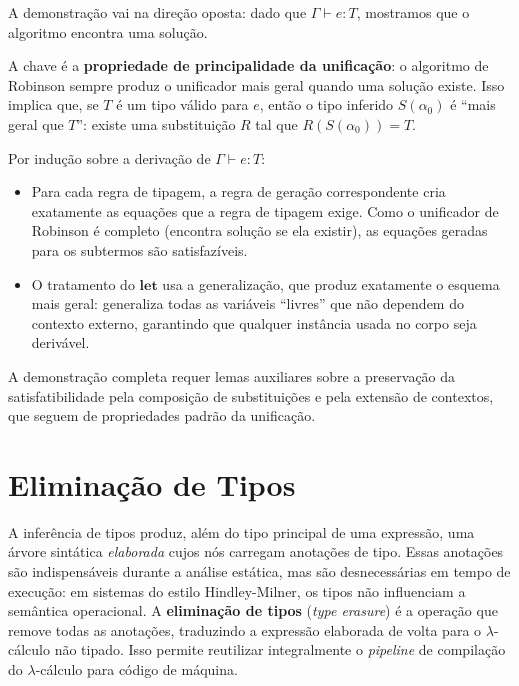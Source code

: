   A demonstração vai na direção oposta: dado que \(\Gamma \vdash e :
  T\), mostramos que o algoritmo encontra uma solução.

  A chave é a \textbf{propriedade de principalidade da unificação}: o
  algoritmo de Robinson sempre produz o unificador mais geral quando
  uma solução existe. Isso implica que, se \(T\) é um tipo válido para
  \(e\), então o tipo inferido \(S(\alpha_0)\) é ``mais geral que
  \(T\)'': existe uma substituição \(R\) tal que \(R(S(\alpha_0)) = T\).

  Por indução sobre a derivação de \(\Gamma \vdash e : T\):

  \begin{itemize}
    \item
      Para cada regra de tipagem, a regra de geração correspondente
      cria exatamente as equações que a regra de tipagem exige. Como o
      unificador de Robinson é completo (encontra solução se ela
      existir), as equações geradas para os subtermos são satisfazíveis.
    \item
      O tratamento do \(\mathbf{let}\) usa a generalização, que produz
      exatamente o esquema mais geral: generaliza todas as variáveis
      ``livres'' que não dependem do contexto externo, garantindo que
      qualquer instância usada no corpo seja derivável.
  \end{itemize}

  A demonstração completa requer lemas auxiliares sobre a preservação
  da satisfatibilidade pela composição de substituições e pela extensão
  de contextos, que seguem de propriedades padrão da unificação.

  \section{Eliminação de Tipos}

  A inferência de tipos produz, além do tipo principal de uma expressão,
  uma árvore sintática \emph{elaborada} cujos nós carregam anotações de
  tipo. Essas anotações são indispensáveis durante a análise estática, mas
  são desnecessárias em tempo de execução: em sistemas do estilo
  Hindley-Milner, os tipos não influenciam a semântica operacional. A
  \textbf{eliminação de tipos} (\emph{type erasure}) é a operação que
  remove todas as anotações, traduzindo a expressão elaborada de volta para
  o $\lambda$-cálculo não tipado. Isso permite reutilizar integralmente o
  \emph{pipeline} de compilação do $\lambda$-cálculo para código de máquina.

